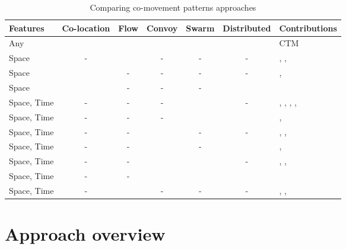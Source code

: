 \documentclass[
]{ceurart}
\newcommand{\cmark}{\ding{51}}%
\begin{document}
\begin{table}[t]
\centering
\scriptsize
\caption{Comparing co-movement patterns approaches}%
\label{tab:related}
\begin{tabular}{lcccccp{4cm}}
\toprule
Features & Co-location & Flow & Convoy & Swarm & Distributed & Contributions \\
\midrule
Any & \cmark & \cmark & \cmark & \cmark & \cmark & CTM \\
Space & - & \cmark & - & - & - & \cite{DBLP:conf/mdm/SilvaLMZC20}, \cite{yang2021scpm}, \cite{tritsarolis2021online} \\
Space & \cmark & - & - & - & - & \cite{lv2019discovering}, \cite{tran2021spatial} \\
Space & \cmark & - & - & - & \cmark & \cite{fonseca2022multi} \\
Space, Time & - & - & - & \cmark & - & \cite{DBLP:conf/sigmod/LeeHW07}, \cite{DBLP:journals/pvldb/LiDHK10}, \cite{DBLP:journals/tkde/HanLO17}, \cite{ailin2019movement}, \cite{li2023relaxed} \\
Space, Time & - & - & - & \cmark & \cmark & \cite{DBLP:conf/icnc/HuKLZ15}, \cite{tampakis2019scalable} \\
Space, Time & - & - & \cmark & - & - & \cite{DBLP:conf/ssdbm/AungT10}, \cite{DBLP:journals/pvldb/OrakzaiCP19}, \cite{DBLP:conf/cikm/Liu0LLYW21} \\
Space, Time & - & - & \cmark & - & \cmark & \cite{DBLP:journals/geoinformatica/OrakzaiPC21}, \cite{tritsarolis2022predicting} \\
Space, Time & - & - & \cmark & \cmark & - & \cite{DBLP:journals/dke/LiBK15}, \cite{DBLP:journals/ijitdm/PhanPT16}, \cite{helmi2020multiscale} \\
Space, Time & - & - & \cmark & \cmark & \cmark & \cite{DBLP:journals/pvldb/FanZWT16} \\
Space, Time & - & \cmark & - & - & - & \cite{DBLP:journals/tmc/HanLO15}, \cite{DBLP:journals/tits/KumarWRLKP18}, \cite{DBLP:journals/pvldb/WangBCSQ19} \\
\bottomrule
\end{tabular}
\end{table}

\section{Approach overview}
\label{sec:Overview}

\end{document}
